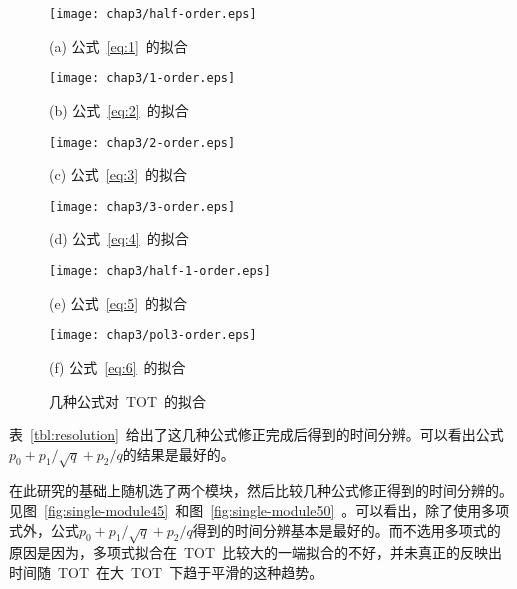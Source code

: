 \begin{figure}[!h]
\begin{minipage}{0.5\linewidth}
  \centerline{\texttt{[image: chap3/half-order.eps]}}
  \centerline{(a) 公式~\ref{eq:1}~的拟合}
  \centerline{\label{fig:half-order}}
\end{minipage}
\hfill
\begin{minipage}{0.5\linewidth}
  \centerline{\texttt{[image: chap3/1-order.eps]}}
  \centerline{(b) 公式~\ref{eq:2}~的拟合}
  \centerline{\label{fig:1-order}}
\end{minipage}
\vfill
\begin{minipage}{0.5\linewidth}
  \centerline{\texttt{[image: chap3/2-order.eps]}}
  \centerline{(c) 公式~\ref{eq:3}~的拟合}
  \centerline{\label{fig:2-order}}
\end{minipage}
\hfill
\begin{minipage}{0.5\linewidth}
  \centerline{\texttt{[image: chap3/3-order.eps]}}
  \centerline{(d) 公式~\ref{eq:4}~的拟合}
  \centerline{\label{fig:3-order}}
\end{minipage}
\vfill
\begin{minipage}{0.5\linewidth}
  \centerline{\texttt{[image: chap3/half-1-order.eps]}}
  \centerline{(e) 公式~\ref{eq:5}~的拟合}
  \centerline{\label{fig:half-1-order}}
\end{minipage}
\hfill
\begin{minipage}{0.5\linewidth}
  \centerline{\texttt{[image: chap3/pol3-order.eps]}}
  \centerline{(f) 公式~\ref{eq:6}~的拟合}
  \centerline{\label{fig:pol3-order}}
\end{minipage}
\caption{几种公式对~TOT~的拟合}
\label{fig:single-formula}
\end{figure}

表~\ref{tbl:resolution}~给出了这几种公式修正完成后得到的时间分辨。可以看出公式${p_{0}+p_{1}/\sqrt{q}+p_{2}/q}$的结果是最好的。

在此研究的基础上随机选了两个模块，然后比较几种公式修正得到的时间分辨的。见图~\ref{fig:single-module45}~和图~\ref{fig:single-module50}~。可以看出，除了使用多项式外，公式${p_{0}+p_{1}/\sqrt{q}+p_{2}/q}$得到的时间分辨基本是最好的。而不选用多项式的原因是因为，多项式拟合在~TOT~比较大的一端拟合的不好，并未真正的反映出时间随~TOT~在大~TOT~下趋于平滑的这种趋势。

